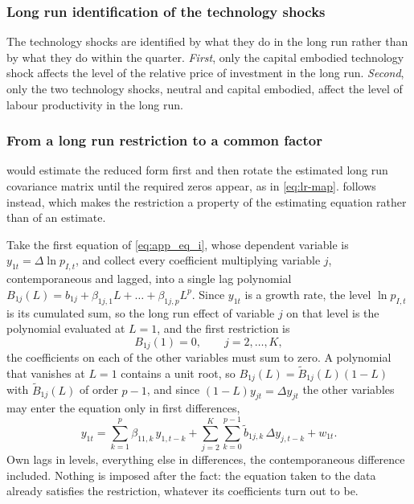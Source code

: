 \documentclass[12pt, a4paper]{article}
\begin{document}
\begin{appendices}
\subsubsection*{Long run identification of the technology shocks}

The technology shocks are identified by what they do in the long run rather than by what they
do within the quarter. \emph{First}, only the capital embodied technology shock affects the
level of the relative price of investment in the long run. \emph{Second}, only the two
technology shocks, neutral and capital embodied, affect the level of labour productivity in the
long run.

\subsubsection*{From a long run restriction to a common factor}

\citet{BlanchardQuah1989} would estimate the reduced form first and then rotate the estimated
long run covariance matrix until the required zeros appear, as in \eqref{eq:lr-map}.
\citet{Fisher2006} follows \citet{Shapiro_Watson88} instead, which makes the restriction a
property of the estimating equation rather than of an estimate.

Take the first equation of \eqref{eq:app_eq_i}, whose dependent variable is
$y_{1t} = \Delta \ln p_{I,t}$, and collect every coefficient multiplying variable $j$,
contemporaneous and lagged, into a single lag polynomial
$B_{1j}(L) = b_{1j} + \beta_{1j,1}L + \dots + \beta_{1j,p}L^{p}$. Since $y_{1t}$ is a growth
rate, the level $\ln p_{I,t}$ is its cumulated sum, so the long run effect of variable $j$ on
that level is the polynomial evaluated at $L = 1$, and the first restriction is
\begin{equation}
    B_{1j}(1) = 0, \qquad j = 2,\dots,K ,
    \label{eq:app_lr_restriction}
\end{equation}
the coefficients on each of the other variables must sum to zero. A polynomial that vanishes at
$L = 1$ contains a unit root, so $B_{1j}(L) = \tilde{B}_{1j}(L)(1-L)$ with $\tilde{B}_{1j}(L)$
of order $p-1$, and since $(1-L)y_{jt} = \Delta y_{jt}$ the other variables may enter the
equation only in first differences,
\begin{equation}
    y_{1t} = \sum_{k=1}^{p}\beta_{11,k}\,y_{1,t-k}
           + \sum_{j=2}^{K}\sum_{k=0}^{p-1} \tilde{b}_{1j,k}\,\Delta y_{j,t-k} + w_{1t} .
    \label{eq:app_eq1_sw}
\end{equation}
Own lags in levels, everything else in differences, the contemporaneous difference included.
Nothing is imposed after the fact: the equation taken to the data already satisfies the
restriction, whatever its coefficients turn out to be.


\end{appendices}
\end{document}

